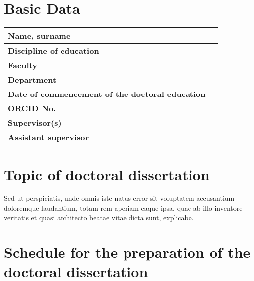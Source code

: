 \section{Basic Data}


\begin{table}[ht]
    \centering
    \begin{tabular}{|p{1.8in}|l|}
    \hline
     \textbf{Name, surname} &  \\ \hline
     \textbf{Discipline of education} &  \\ \hline
     \textbf{Faculty} &  \\ \hline
     \textbf{Department} &  \\ \hline
     \textbf{Date of commencement of the doctoral education} &  \\ \hline
     \textbf{ORCID No.} &  \\ \hline
     \textbf{Supervisor(s)} &  \\ \hline
     \textbf{Assistant supervisor} &  \\ \hline
    \end{tabular}
\end{table}


\section{Topic of doctoral dissertation}


Sed ut perspiciatis, unde omnis iste natus error sit voluptatem accusantium doloremque laudantium, totam rem aperiam eaque ipsa, quae ab illo inventore veritatis et quasi architecto beatae vitae dicta sunt, explicabo.


\section{Schedule for the preparation of the doctoral dissertation}

